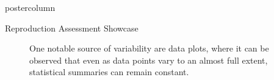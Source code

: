 \begin{frame}
\begin{columns}
\begin{column}{.59\textwidth}
\begin{beamercolorbox}[center]{postercolumn}
\begin{minipage}{.98\textwidth}
{\begin{myblock}{Reproduction Assessment Showcase}
\begin{minipage}{.58\textwidth}
\begin{figure}
						\end{figure}
						\begin{figure}
							\vspace{0.2em}
							\caption{
								One notable source of variability are data plots, where it can be observed that even as data points vary to an almost full extent, statistical summaries can remain constant.
							}
						\end{figure}
						\end{minipage}
						\hfill
						\begin{minipage}{.38\textwidth}
						\vspace{1.3em}
						\begin{figure}

\end{figure}
\end{minipage}
\end{myblock}}
\end{minipage}
\end{beamercolorbox}
\end{column}
\end{columns}
\end{frame}

